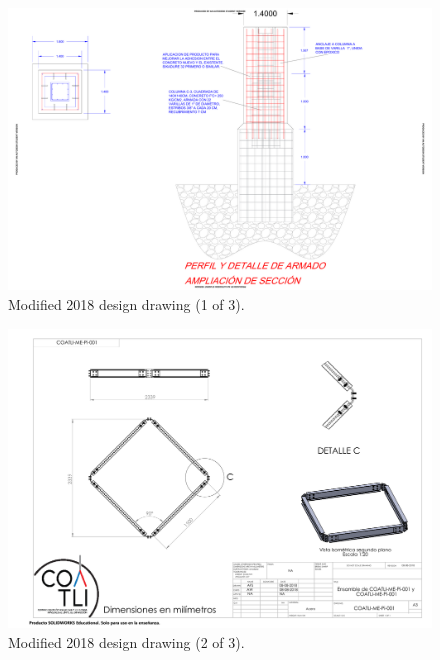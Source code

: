 \begin{figure}
\begin{center}
\includegraphics[height=0.95\linewidth,angle=90]{figures/buildings-coatli-drawing-2018-1.pdf}
\end{center}
\caption{{\projectname} Modified 2018 design drawing (1 of 3).}
\label{figure:buildings-drawing-2018-1}
\end{figure}

\begin{figure}
\begin{center}
\includegraphics[height=0.95\linewidth,angle=90]{figures/buildings-coatli-drawing-2018-2.pdf}
\end{center}
\caption{{\projectname} Modified 2018 design drawing (2 of 3).}
\label{figure:buildings-drawing-2018-2}
\end{figure}

